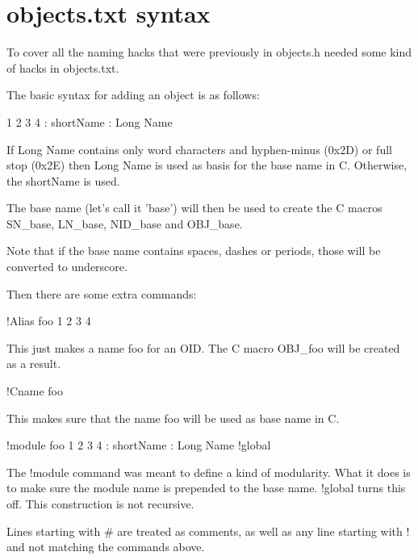 \chapter{objects.\+txt syntax}
\hypertarget{md__c_1_2_users_2namph_2_downloads_2openssl_2openssl-3_82_81_2crypto_2objects_2_r_e_a_d_m_e}{}\label{md__c_1_2_users_2namph_2_downloads_2openssl_2openssl-3_82_81_2crypto_2objects_2_r_e_a_d_m_e}
To cover all the naming hacks that were previously in {\ttfamily objects.\+h} needed some kind of hacks in {\ttfamily objects.\+txt}.

The basic syntax for adding an object is as follows\+: \begin{DoxyVerb}    1 2 3 4         : shortName     : Long Name

            If Long Name contains only word characters and hyphen-minus
            (0x2D) or full stop (0x2E) then Long Name is used as basis
            for the base name in C. Otherwise, the shortName is used.

            The base name (let's call it 'base') will then be used to
            create the C macros SN_base, LN_base, NID_base and OBJ_base.

            Note that if the base name contains spaces, dashes or periods,
            those will be converted to underscore.
\end{DoxyVerb}
 Then there are some extra commands\+: \begin{DoxyVerb}    !Alias foo 1 2 3 4

            This just makes a name foo for an OID.  The C macro
            OBJ_foo will be created as a result.

    !Cname foo

            This makes sure that the name foo will be used as base name
            in C.

    !module foo
    1 2 3 4         : shortName     : Long Name
    !global

            The !module command was meant to define a kind of modularity.
            What it does is to make sure the module name is prepended
            to the base name.  !global turns this off.  This construction
            is not recursive.
\end{DoxyVerb}
 Lines starting with {\ttfamily \#} are treated as comments, as well as any line starting with ! and not matching the commands above. 